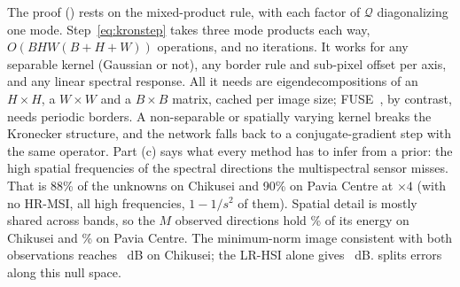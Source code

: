 \documentclass[10pt,twocolumn,letterpaper]{article}
\begin{document}
The proof (\supp) rests on the mixed-product rule, with each factor of $\mathcal{Q}$ diagonalizing one mode. Step~\eqref{eq:kronstep} takes three mode products each way, $O(BHW(B+H+W))$ operations, and no iterations. It works for any separable kernel (Gaussian or not), any border rule and sub-pixel offset per axis, and any linear spectral response. All it needs are eigendecompositions of an $H\times H$, a $W\times W$ and a $B\times B$ matrix, cached per image size; FUSE~\cite{wei2015fuse}, by contrast, needs periodic borders. A non-separable or spatially varying kernel breaks the Kronecker structure, and the network falls back to a conjugate-gradient step with the same operator. Part (c) says what every method has to infer from a prior: the high spatial frequencies of the spectral directions the multispectral sensor misses. That is 88\% of the unknowns on Chikusei and 90\% on Pavia Centre at $\times4$ (with no HR-MSI, all high frequencies, $1-1/s^2$ of them). Spatial detail is mostly shared across bands, so the $M$ observed directions hold \% of its energy on Chikusei and \% on Pavia Centre. The minimum-norm image consistent with both observations reaches ~dB on Chikusei; the LR-HSI alone gives ~dB.  splits errors along this null space.
\end{document}
